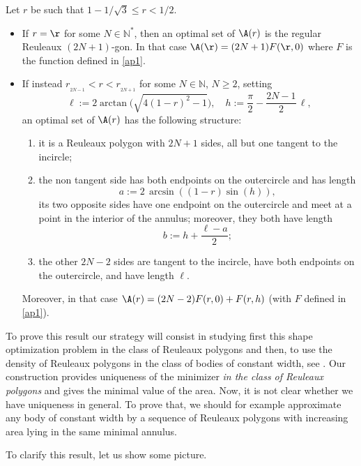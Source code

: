 \skpt
\begin{theorem}\label{thm}
Let $r$ be such that $1-1/\sqrt{3}\leq r < 1/2$. 

\begin{itemize}
\item
If $r=\r$ for some $N\in \mathbb N^*$, then {an} optimal set of $\A(r)$ is the regular Reuleaux $(2N+1)$-gon. In that case $\A(\r)=(2N+1)F(\r,0)$ where $F$ is the function defined in \eqref{ap1}.

\item
If instead $r_{_{2N-1}}<r<r_{_{2N+1}}$ for some $N\in \mathbb N$, $N\geq 2$,
setting
\[
\ell:=2 \arctan\bigl(\sqrt{4(1-r)^2-1}\bigr),\quad h:=\frac\pi2 - \frac{2N-1}{2}\, \ell,
\]
an optimal set of $\A(r)$ has the following structure:
\begin{enumerate}
\item
it is a Reuleaux polygon with $2N+1$ sides, all but one tangent to the incircle;
\item
the non tangent side has both endpoints on the outercircle and has length
\[
a:=2\,\arcsin\left((1-r)\sin(h)\right),
\]
its two opposite sides have one endpoint on the outercircle and meet at a point in the interior of the annulus; moreover, they both have length
\[
b:= h + \frac{\ell -a}{2};
\]
\item
the other $2N-2$ sides are tangent to the incircle, have both endpoints on the outercircle, and have length $\ell$.
\end{enumerate}
Moreover, in that case $\A(r)=(2N-2)F(r,0)+F(r,h)$ (with $F$ defined in \eqref{ap1}).
\end{itemize}
\end{theorem}

\begin{remark}
To prove this result our strategy will consist in studying first this shape optimization problem
in the class of Reuleaux polygons and then, to use the density of Reuleaux polygons in the class of bodies of constant width, see \eg \cite{BF}.
Our construction provides uniqueness of the minimizer \emph{in the class of Reuleaux polygons}
and gives the minimal value of the area.
Now, it is not clear whether we have uniqueness in general. To prove that, we should
for example approximate any body of constant width by a sequence of Reuleaux polygons with increasing area lying in the same minimal annulus.
\end{remark}
To clarify this result, let us show some picture.

